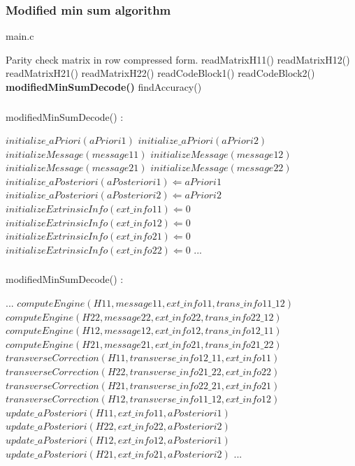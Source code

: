 \documentclass[xcolor=dvipsname]
{beamer}
\begin{document}
\begin{frame}[t]
\frametitle{ Modified min sum algorithm }                                 %
\alert{ main.c }
\begin{algorithmic}                   
    \REQUIRE Parity check matrix in row compressed form.
    \STATE readMatrixH11()
    \STATE readMatrixH12()
    \STATE readMatrixH21()
    \STATE readMatrixH22()
    \STATE readCodeBlock1()
    \STATE readCodeBlock2()
    \STATE \textbf{modifiedMinSumDecode()}
    \STATE findAccuracy()

\end{algorithmic}
\end{frame}


\begin{frame}[t]
\frametitle{  }                                 %
\alert{ modifiedMinSumDecode()	: }
\begin{algorithmic}                   
    \STATE $initialize\_aPriori(aPriori1) $
    \STATE $initialize\_aPriori(aPriori2) $
    \STATE $initializeMessage(message11) $
    \STATE $initializeMessage(message12) $
    \STATE $initializeMessage(message21) $
    \STATE $initializeMessage(message22) $
    	\STATE$ initialize\_aPosteriori(aPosteriori1) \Leftarrow aPriori1 $
    	\STATE$ initialize\_aPosteriori(aPosteriori2) \Leftarrow aPriori2 $
   		\STATE $initializeExtrinsicInfo(ext\_info11) \Leftarrow 0 $
   		\STATE $initializeExtrinsicInfo(ext\_info12) \Leftarrow 0 $
   		\STATE $initializeExtrinsicInfo(ext\_info21) \Leftarrow 0 $
   		\STATE $initializeExtrinsicInfo(ext\_info22) \Leftarrow 0 $
   		\STATE ... 		
   		 \ENDWHILE 
\end{algorithmic}
\end{frame}

\begin{frame}[t]
\frametitle{  }                                 %
\alert{ modifiedMinSumDecode()	: }
\begin{algorithmic}   
\STATE ...               
\STATE$computeEngine(H11,message11,ext\_info11,trans\_info11\_12)$
\STATE$computeEngine(H22,message22,ext\_info22,trans\_info22\_12)$
\STATE$computeEngine(H12,message12,ext\_info12,trans\_info12\_11)$
\STATE$computeEngine(H21,message21,ext\_info21,trans\_info21\_22)$
\STATE$transverseCorrection(H11,transverse\_info12\_11,ext\_info11)$
\STATE$transverseCorrection(H22,transverse\_info21\_22,ext\_info22)$
\STATE$transverseCorrection(H21,transverse\_info22\_21,ext\_info21)$
\STATE$transverseCorrection(H12,transverse\_info11\_12,ext\_info12)$
\STATE$update\_aPosteriori (H11 , ext\_info11 ,aPosteriori1)$
\STATE$update\_aPosteriori (H22 , ext\_info22 ,aPosteriori2)$
\STATE$update\_aPosteriori (H12 , ext\_info12 ,aPosteriori1)$
\STATE$update\_aPosteriori (H21 , ext\_info21 ,aPosteriori2)$
\STATE ...
     	
 \ENDWHILE    


  		
\end{algorithmic}
\end{frame}
\end{document}
